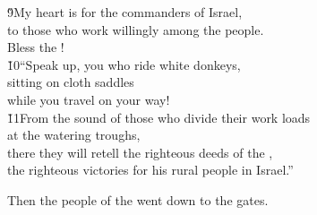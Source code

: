 \begin{poetry}
\poeml \v{9}My heart is for the commanders of Israel, \\
\poemll    to those who work willingly among the people. \\
\poemlll       Bless the ! \\
\poeml \v{10}``Speak up, you who ride white donkeys, \\
\poemll    sitting on cloth saddles \\
\poemlll       while you travel on your way! \\
\poeml \v{11}From the sound of those who divide their work loads \\
\poemll    at the watering troughs, \\
\poeml there they will retell the righteous deeds of the , \\
\poemll    the righteous victories for his rural people in Israel.''
\end{poetry}

Then the people of the  went down to the gates.

